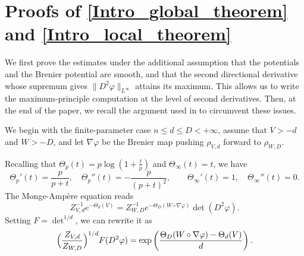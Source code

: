 \documentclass[11pt,a4paper,reqno]{amsart}
\numberwithin{equation}{section}
\theoremstyle{definition}
\newcommand{\<}{\ensuremath \leq}
\renewcommand{\>}{\ensuremath \geq}
\newcommand{\ThetaPar}{\Theta}
\newcommand{\Znorm}[2]{Z_{#1,#2}}
\begin{document}
\section[Proofs of the main estimates]{Proofs of \texorpdfstring{\cref{Intro_global_theorem} and \cref{Intro_local_theorem}}{the main estimates}}

We first prove the estimates under the additional assumption that the potentials and the Brenier potential are smooth, and that the second directional derivative whose supremum gives $\|D^2\varphi\|_{L^\infty}$ attains its maximum. This allows us to write the maximum-principle computation at the level of second derivatives. Then, at the end of the paper, we recall the argument used in \cite{Alessio_Carlier_Santa} to circumvent these issues.

We begin with the finite-parameter case $n\le d\le D<+\infty$, assume that $V>-d$ and $W>-D$, and let $\nabla\varphi$ be the Brenier map pushing $\rho_{V,d}$ forward to $\rho_{W,D}$.

Recalling that $\ThetaPar_p(t)=p\log\left(1+\frac{t}{p}\right)$ and $\ThetaPar_\infty(t)=t$, we have
\[
   \ThetaPar_p'(t)=\frac{p}{p+t}, \quad
    \ThetaPar_p''(t)=-\frac{p}{(p+t)^2},\qquad \ThetaPar_\infty'(t)=1,\quad \ThetaPar_\infty''(t)=0.
\]
The Monge-Amp\`ere equation reads
\[
    \Znorm{V}{d}^{-1}e^{-\ThetaPar_d(V)}
    =
    \Znorm{W}{D}^{-1}e^{-\ThetaPar_D(W\circ\nabla\varphi)}
    \det(D^2\varphi).
\]
Setting $F=\det^{1/d}$, we can rewrite it as
\begin{equation}\label{MA_two_parameter}
    \Bigl(\frac{\Znorm{V}{d}}{\Znorm{W}{D}}\Bigr)^{1/d}
    F(D^2\varphi)
    =
    \exp\left(\frac{\ThetaPar_D(W\circ\nabla\varphi)-\ThetaPar_d(V)}{d}\right).
\end{equation}
\end{document}
